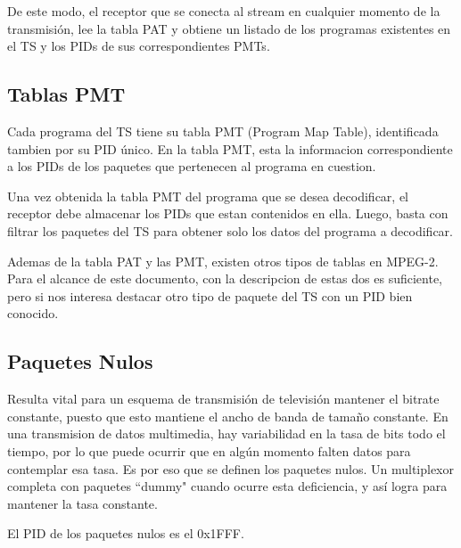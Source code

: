 	De este modo, el receptor que se conecta al stream en cualquier momento de la transmisión, lee la tabla PAT y obtiene un listado de los programas existentes en el TS y los PIDs de sus correspondientes PMTs. 

	\subsection{Tablas PMT}

	Cada programa del TS tiene su tabla PMT (Program Map Table), identificada tambien por su PID único. En la tabla PMT, esta la informacion correspondiente a los PIDs de los paquetes que pertenecen al programa en cuestion.
	
	Una vez obtenida la tabla PMT del programa que se desea decodificar, el receptor debe almacenar los PIDs que estan contenidos en ella. Luego, basta con filtrar los paquetes del TS para obtener solo los datos del programa a decodificar. 
		
	Ademas de la tabla PAT y las PMT, existen otros tipos de tablas en MPEG-2. Para el alcance de este documento, con la descripcion de estas dos es suficiente, pero si nos interesa destacar otro tipo de paquete del TS con un PID bien conocido.
	
	\subsection{Paquetes Nulos}
	
	Resulta vital para un esquema de transmisión de televisión mantener el bitrate constante, puesto que esto mantiene el ancho de banda de tamaño constante. En una transmision de datos multimedia, hay variabilidad en la tasa de bits todo el tiempo, por lo que puede ocurrir que en algún momento falten datos para contemplar esa tasa. Es por eso que se definen los paquetes nulos. Un multiplexor completa con paquetes ``dummy" cuando ocurre esta deficiencia, y así logra para mantener la tasa constante.
	
	El PID de los paquetes nulos es el 0x1FFF.

